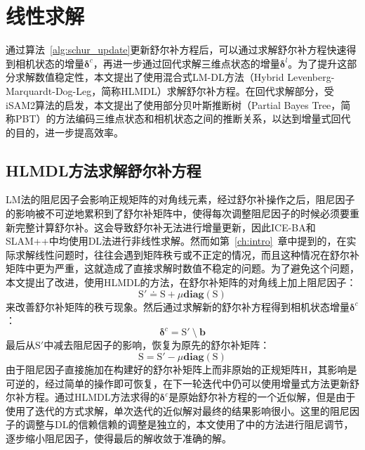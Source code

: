\section{线性求解}\label{sec:lin_solver}

通过算法~\ref{alg:schur_update}更新舒尔补方程后，可以通过求解舒尔补方程快速得到相机状态的增量$\bm{\delta}^c$，再进一步通过回代求解三维点状态的增量$\bm{\delta}^l$。为了提升这部分求解数值稳定性，本文提出了使用混合式LM-DL方法（Hybrid Levenberg-Marquardt-Dog-Leg，简称HLMDL）求解舒尔补方程。在回代求解部分，受iSAM2\citep{kaess2012isam2}算法的启发，本文提出了使用部分贝叶斯推断树（Partial Bayes Tree，简称PBT）的方法编码三维点状态和相机状态之间的推断关系，以达到增量式回代的目的，进一步提高效率。

\subsection{HLMDL方法求解舒尔补方程}

LM法的阻尼因子会影响正规矩阵的对角线元素，经过舒尔补操作之后，阻尼因子的影响被不可逆地累积到了舒尔补矩阵中，使得每次调整阻尼因子的时候必须要重新完整计算舒尔补。这会导致舒尔补无法进行增量更新，因此ICE-BA\citep{liu2018ice}和SLAM++中均使用DL法进行非线性求解。然而如第~\ref{ch:intro}~章中提到的，在实际求解线性问题时，往往会遇到矩阵秩亏或不正定的情况，而且这种情况在舒尔补矩阵中更为严重，这就造成了直接求解时数值不稳定的问题。为了避免这个问题，本文提出了改进，使用HLMDL的方法，在舒尔补矩阵的对角线上加上阻尼因子：
\begin{equation}
    \mathrm{S}' \doteq \mathrm{S}+\mu\mathbf{diag}(\mathrm{S})
\end{equation}
来改善舒尔补矩阵的秩亏现象。然后通过求解新的舒尔补方程得到相机状态增量$\bm{\delta}^c$：
\begin{equation}
    \bm{\delta}^c = \mathrm{S}' \:\setminus\: \bm{b}
    \label{eq:hlmdl}
\end{equation}
最后从$\mathrm{S}'$中减去阻尼因子的影响，恢复为原先的舒尔补矩阵：
\begin{equation}
    \mathrm{S} = \mathrm{S}'-\mu\mathbf{diag}(\mathrm{S})
\end{equation}
由于阻尼因子直接施加在构建好的舒尔补矩阵上而非原始的正规矩阵$\mathrm{H}$，其影响是可逆的，经过简单的操作即可恢复，在下一轮迭代中仍可以使用增量式方法更新舒尔补方程。通过HLMDL方法求得的$\bm{\delta}^c$是原始舒尔补方程的一个近似解，但是由于使用了迭代的方式求解，单次迭代的近似解对最终的结果影响很小。这里的阻尼因子的调整与DL的信赖信赖的调整是独立的，本文使用了中的方法进行阻尼调节，逐步缩小阻尼因子，使得最后的解收敛于准确的解。

